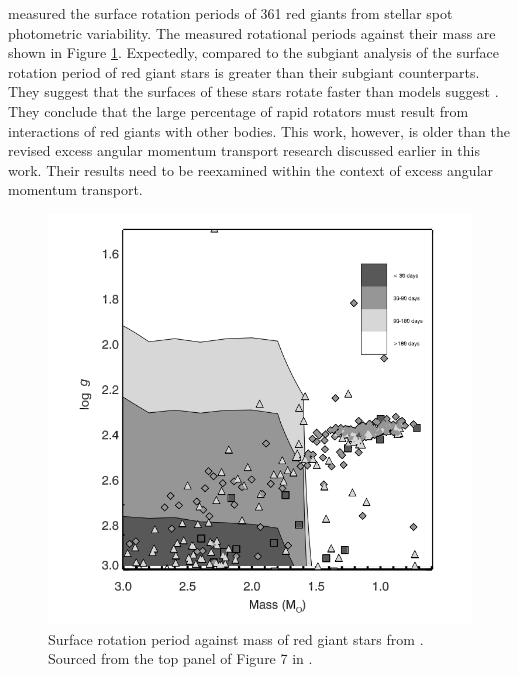 \citet{ceillier_surface_2017} measured the surface rotation periods of 361 red giants from stellar spot photometric variability.
The measured rotational periods against their mass are shown in Figure \ref{fig:rgb_surface}.
Expectedly, compared to the subgiant analysis of \citet{santos_surface_2021} the surface rotation period of red giant stars is greater than their subgiant counterparts.
They suggest that the surfaces of these stars rotate faster than models suggest \citep{tayar_rapid_2015}.
They conclude that the large percentage of rapid rotators must result from interactions of red giants with other bodies.
This work, however, is older than the revised excess angular momentum transport research discussed earlier in this work.
Their results need to be reexamined within the context of excess angular momentum transport.

\begin{figure}[h]
    \includegraphics[width=\textwidth]{Figures/intro_figures/rgb_surface.png}
    \caption[Surface rotation period distribution of red giant stars]{Surface rotation period against mass of red giant stars from \citet{ceillier_surface_2017}.
    Sourced from the top panel of Figure 7 in \citep{ceillier_surface_2017}.}
    \label{fig:rgb_surface}
\end{figure}

